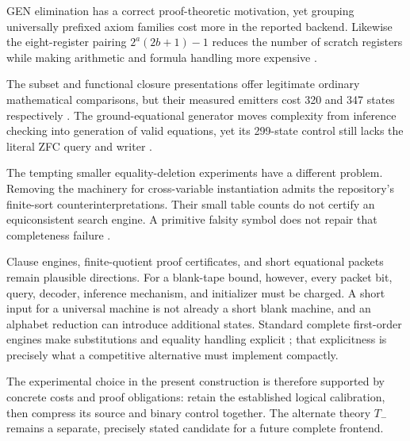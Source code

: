 GEN elimination has a correct proof-theoretic motivation,
yet grouping universally prefixed axiom families cost more
in the reported backend. Likewise the eight-register pairing
$2^a(2b+1)-1$ reduces the number of scratch registers while
making arithmetic and formula handling more expensive
\cite{genfree,registers}.

The subset and functional closure presentations offer
legitimate ordinary mathematical comparisons, but their
measured emitters cost 320 and 347 states respectively
\cite{functional}. The ground-equational generator moves
complexity from inference checking into generation of
valid equations, yet its 299-state control still lacks
the literal ZFC query and writer \cite{equational}.

The tempting smaller equality-deletion experiments have
a different problem. Removing the machinery for
cross-variable instantiation admits the repository's
finite-sort counterinterpretations. Their small table
counts do not certify an equiconsistent search engine.
A primitive falsity symbol does not repair that
completeness failure \cite{countermodel}.

Clause engines, finite-quotient proof certificates, and
short equational packets remain plausible directions.
For a blank-tape bound, however, every packet bit, query,
decoder, inference mechanism, and initializer must be
charged. A short input for a universal machine is not
already a short blank machine, and an alphabet reduction
can introduce additional states. Standard complete
first-order engines make substitutions and equality
handling explicit \cite{avigad}; that explicitness is
precisely what a competitive alternative must implement
compactly.

The experimental choice in the present construction is
therefore supported by concrete costs and proof
obligations: retain the established logical calibration,
then compress its source and binary control together.
The alternate theory $T_-$ remains a separate, precisely
stated candidate for a future complete frontend.
